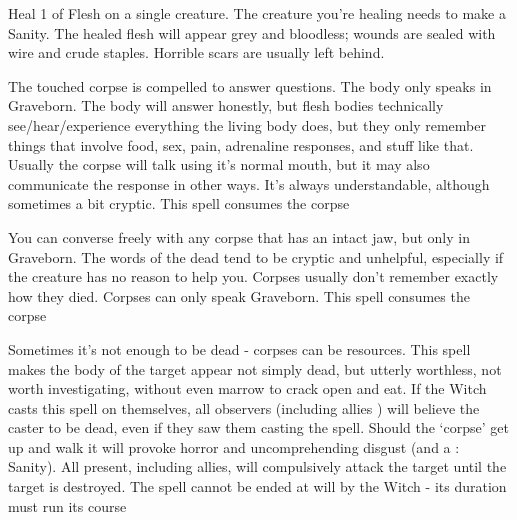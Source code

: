{\NECRO[
  Name=Knit Flesh,
  Link=necromancy-knit-flesh,
  Paradigm=Death,
  Save=N,
  Duration=0,
  Mod=+9,
  Keywords=None,
  Target=Close (touch) creature
]


Heal 1 \HD of Flesh on a single creature. The creature you're healing needs to make a \RS Sanity.  The healed flesh will appear grey and bloodless; wounds are sealed with wire and crude staples.  Horrible scars are usually left behind.


\NECRO[
  Name=Necrography,
  Link=necromancy-necrography,
  Paradigm=Death,
  Save=N,
  Duration=\LVL Minutes,
  Mod=+6,
  Keywords=None,
  Target=Close (touch) Mortal corpse
]

The touched corpse is compelled to answer \LVL questions.  The body only speaks in Graveborn. The body will answer honestly, but flesh bodies technically see/hear/experience everything the living body does, but they only remember things that involve food, sex, pain, adrenaline responses, and stuff like that. Usually the corpse will talk using it's normal mouth, but it may also communicate the response in other ways. It's always understandable, although sometimes a bit cryptic.  This spell consumes the corpse

\NECRO[
  Name=Speak with Dead,
  Link=necromancy-speak-with-dead,
  Paradigm=Death,
  Save=N,
  Duration=\LVL x2 Minutes,
  Mod=+3,
  Keywords=None,
  Target=Close (touch) Mortal corpse
]


You can converse freely with any corpse that has an intact jaw, but only in Graveborn. The words of the dead tend to be cryptic and unhelpful, especially if the creature has no reason to help you. Corpses usually don't remember exactly how they died. Corpses can only speak Graveborn.  This spell consumes the corpse

\NECRO[
  Name=Worthless Corpse,
  Link=necromancy-worthless-corpse,
  Paradigm=Death,
  Save=N,
  Duration=Session,
  Mod=+0,
  Keywords=None,
  Target=Close (touch) Mortal corpse
]


Sometimes it's not enough to be dead - corpses can be resources. This spell makes the body of the target appear not simply dead, but utterly worthless, not worth investigating, without even marrow to crack open and eat. If the Witch casts this spell on themselves, all observers (including allies ) will believe the caster to be dead, even if they saw them casting the spell. Should the ‘corpse’ get up and walk it will provoke horror and uncomprehending disgust (and a \RS: Sanity). All present, including allies, will compulsively attack the target until the target is destroyed.  The spell cannot be ended at will by the Witch - its duration must run its course

}

